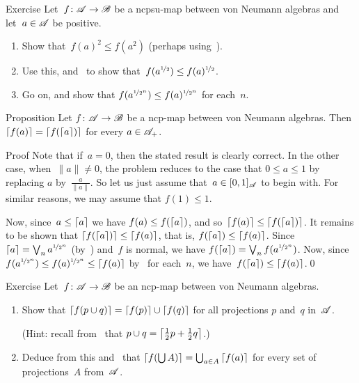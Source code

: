 \documentclass[a]{subfiles}
\begin{document}
\begin{parsec}%
\begin{point}{Exercise}%
Let~$f\colon \mathscr{A}\to\mathscr{B}$ be a ncpsu-map
between von Neumann algebras
and let~$a\in \mathscr{A}$ be positive.
\begin{enumerate}
\item
Show that~$f(a)^2 \leq f(a^2)$
(perhaps using~).
\item
	Use this, and~
to show that~$f(a^{\nicefrac{1}{2}}) \leq f(a)^{\nicefrac{1}{2}}$.
\item
Go on, and show that $f(a^{\nicefrac{1}{2^n}})
\leq f(a)^{\nicefrac{1}{2^n}}$ for each~$n$.
\end{enumerate}
\end{point}
\begin{point}{Proposition}%
Let $f\colon \mathscr{A}\to\mathscr{B}$ be a ncp-map
between von Neumann algebras.
Then $\left\lceil f(a)\right\rceil=\left\lceil f(\left\lceil a\right\rceil)\right\rceil$
for every $a\in\mathscr{A}_+$.
\begin{point}{Proof}%
Note that if~$a=0$,
then
the stated result is clearly correct.
In the other case, when~$\|a\| \neq 0$,
the problem reduces to the case
that $0\leq a\leq 1$
by replacing $a$ by~$\frac{a}{\|a\|}$.
So let us just assume that~$a\in [0,1]_{\mathscr{A}}$
to begin with.
For similar reasons, we may assume that $f(1)\leq 1$.

Now, since~$a\leq \left\lceil a\right\rceil$
we have $f(a)\leq f(\left\lceil a\right\rceil)$,
and so~$\left\lceil f(a)\right\rceil\leq \left\lceil f(\left\lceil a\right\rceil)\right\rceil$.
It remains to be shown that $\left\lceil f(\left\lceil a\right\rceil)\right\rceil\leq \left\lceil f(a)\right\rceil$,
that is, $f(\left\lceil a\right\rceil)\leq \left\lceil f(a)\right\rceil$.
Since  $\left\lceil a\right\rceil=\bigvee_n a^{\nicefrac{1}{2^n}}$ 
(by~)
and~$f$ is normal,
we have $f(\left\lceil a\right\rceil)=\bigvee_n f(a^{\nicefrac{1}{2^n}})$.
Now, since $f(a^{\nicefrac{1}{2^n}})\leq f(a)^{\nicefrac{1}{2^n}}
\leq \left\lceil f(a)\right\rceil$
by~ for each~$n$,
we have~$f(\left\lceil a\right\rceil)\leq \left\lceil f(a)\right\rceil$.\qed
\end{point}
\end{point}
\begin{point}{Exercise}%
Let~$f\colon \mathscr{A}\to\mathscr{B}$ be an ncp-map
between von Neumann algebras.
\begin{enumerate}
\item
Show that
$\left\lceil f(p\cup q)\right\rceil
= \left\lceil f(p)\right\rceil\cup\left\lceil f(q)\right\rceil$
for all projections $p$ and~$q$ in~$\mathscr{A}$.

(Hint: recall from~ 
that $p\cup q = \left\lceil\frac{1}{2}p+\frac{1}{2}q\right\rceil$.)

\item
Deduce from this and~ that $\left\lceil f(\bigcup A)\right\rceil=\bigcup_{a\in A}\left\lceil f(a)\right\rceil$
for every set of projections~$A$ from~$\mathscr{A}$.
\end{enumerate}
\end{point}
\end{parsec}
\end{document}
